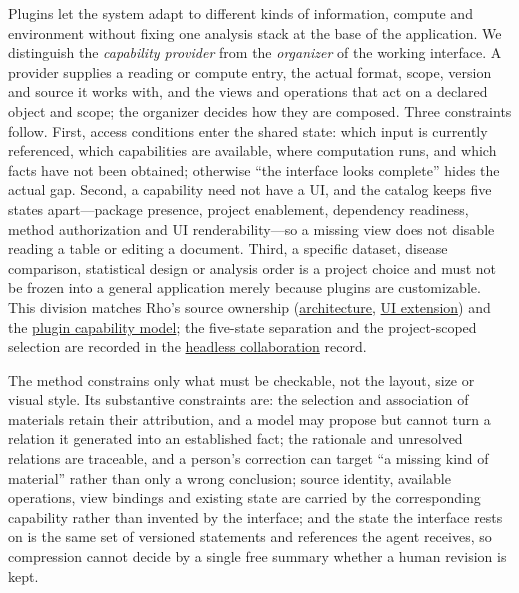 \documentclass[11pt]{article}
\begin{document}
Plugins let the system adapt to different kinds of information, compute and environment without fixing one analysis stack at the base of the application. We distinguish the \emph{capability provider} from the \emph{organizer} of the working interface. A provider supplies a reading or compute entry, the actual format, scope, version and source it works with, and the views and operations that act on a declared object and scope; the organizer decides how they are composed. Three constraints follow. First, access conditions enter the shared state: which input is currently referenced, which capabilities are available, where computation runs, and which facts have not been obtained; otherwise ``the interface looks complete'' hides the actual gap. Second, a capability need not have a UI, and the catalog keeps five states apart---package presence, project enablement, dependency readiness, method authorization and UI renderability---so a missing view does not disable reading a table or editing a document. Third, a specific dataset, disease comparison, statistical design or analysis order is a project choice and must not be frozen into a general application merely because plugins are customizable. This division matches Rho's source ownership (\href{https://github.com/YuLab-SMU/Rho/blob/main/docs/ARCHITECTURE.md}{architecture}, \href{https://github.com/YuLab-SMU/Rho/blob/main/docs/PLUGIN-AUTHORING.md}{UI extension}) and the \href{https://github.com/YuLab-SMU/Rho-plugins/blob/main/docs/PLUGIN-MODEL.md}{plugin capability model}; the five-state separation and the project-scoped selection are recorded in the \href{https://github.com/YuLab-SMU/Rho/blob/main/docs/COLLABORATION.md}{headless collaboration} record.

The method constrains only what must be checkable, not the layout, size or visual style. Its substantive constraints are: the selection and association of materials retain their attribution, and a model may propose but cannot turn a relation it generated into an established fact; the rationale and unresolved relations are traceable, and a person's correction can target ``a missing kind of material'' rather than only a wrong conclusion; source identity, available operations, view bindings and existing state are carried by the corresponding capability rather than invented by the interface; and the state the interface rests on is the same set of versioned statements and references the agent receives, so compression cannot decide by a single free summary whether a human revision is kept.
\end{document}
